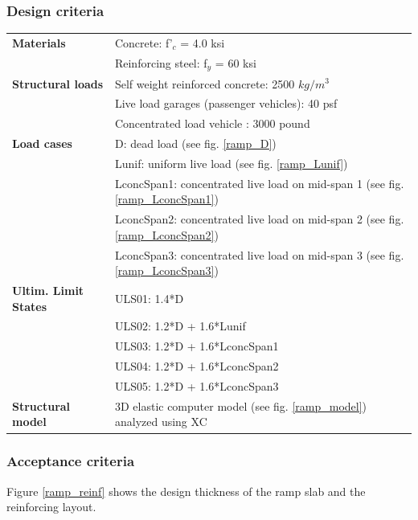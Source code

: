 \subsubsection{Design criteria} \label{ramp_desCrit}
\begin{center}
\begin{tabular}{lp{9cm}}
  \textbf{Materials} & Concrete: f'$_c$ = 4.0 ksi\\
  & Reinforcing steel: f$_y$ = 60 ksi \\
  \textbf{Structural loads} & Self weight reinforced concrete: 2500 $kg/m^3$\\
  & Live load garages (passenger vehicles): 40 psf \\
  & Concentrated load vehicle : 3000 pound \\
  \textbf{Load cases} & D: dead load (see fig. \ref{ramp_D}) \\
  & Lunif: uniform live load (see fig. \ref{ramp_Lunif}) \\
  & LconcSpan1: concentrated live load on mid-span 1 (see fig. \ref{ramp_LconcSpan1}) \\
  & LconcSpan2: concentrated live load on mid-span 2 (see fig. \ref{ramp_LconcSpan2}) \\
  & LconcSpan3: concentrated live load on mid-span 3 (see fig. \ref{ramp_LconcSpan3}) \\
  \textbf{Ultim. Limit States} & ULS01: 1.4*D \\
  & ULS02: 1.2*D + 1.6*Lunif \\
  & ULS03: 1.2*D + 1.6*LconcSpan1 \\
  & ULS04: 1.2*D + 1.6*LconcSpan2 \\
  & ULS05: 1.2*D + 1.6*LconcSpan3 \\
 
  \textbf{Structural model} & 3D elastic computer model (see fig. \ref{ramp_model}) analyzed using XC \\
\end{tabular}
\end{center}

\subsubsection{Acceptance criteria}
Figure \ref{ramp_reinf} shows the design thickness of the ramp slab and the reinforcing layout.

